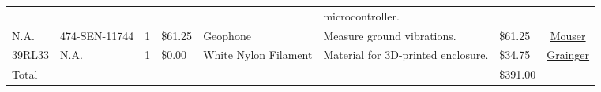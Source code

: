 \documentclass[12pt,landscape]{article}
\begin{document}
\begin{table}[H]
{\begin{tabular}{l|l|c|l|l|l|l|c}
    	& & & & & microcontroller. & & \\
		N.A. & 474-SEN-11744 & 1 & \$61.25 & Geophone & Measure ground vibrations. & \$61.25 & \href{http://www.mouser.com/ProductDetail/SparkFun-Electronics/SEN-11744/?qs=\%2fha2pyFaduhLW6YoPw5UUIdTRP1X\%252btPruyfOHvl8\%2fY0\%3d}{Mouser} \\
    	 39RL33 & N.A. & 1 & \$0.00 & White Nylon Filament & Material for 3D-printed enclosure. & \$34.75 & \href{https://www.grainger.com/product/FILABOT-White-Filament-39RL33}{Grainger} \\ \hline
    	Total & & & & & & \$391.00
	\end{tabular}%
	}
    \label{tab:bom}
\end{table}
\end{document}

